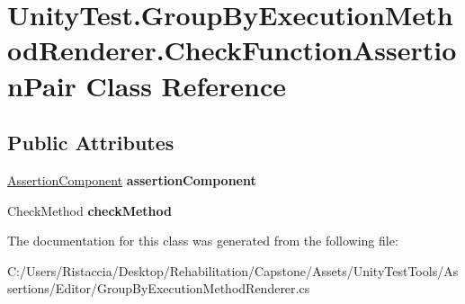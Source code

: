 \hypertarget{class_unity_test_1_1_group_by_execution_method_renderer_1_1_check_function_assertion_pair}{}\section{Unity\+Test.\+Group\+By\+Execution\+Method\+Renderer.\+Check\+Function\+Assertion\+Pair Class Reference}
\label{class_unity_test_1_1_group_by_execution_method_renderer_1_1_check_function_assertion_pair}
\subsection*{Public Attributes}
\begin{DoxyCompactItemize}
\item 
\mbox{\label{class_unity_test_1_1_group_by_execution_method_renderer_1_1_check_function_assertion_pair_a8ad9a44f25582bb9f1ebdc5651597670}} 
\hyperlink{class_unity_test_1_1_assertion_component}{Assertion\+Component} {\bfseries assertion\+Component}
\item 
\mbox{\label{class_unity_test_1_1_group_by_execution_method_renderer_1_1_check_function_assertion_pair_a30451fbc91a76754f40bb0f304e682fa}} 
Check\+Method {\bfseries check\+Method}
\end{DoxyCompactItemize}


The documentation for this class was generated from the following file\+:\begin{DoxyCompactItemize}
\item 
C\+:/\+Users/\+Ristaccia/\+Desktop/\+Rehabilitation/\+Capstone/\+Assets/\+Unity\+Test\+Tools/\+Assertions/\+Editor/Group\+By\+Execution\+Method\+Renderer.\+cs\end{DoxyCompactItemize}
